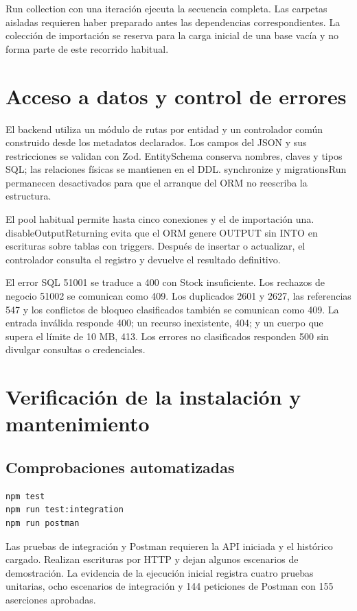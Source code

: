 \documentclass[10pt,letterpaper]{article}
\begin{document}
Run collection con una iteración ejecuta la secuencia completa. Las carpetas aisladas requieren haber preparado antes las dependencias correspondientes. La colección de importación se reserva para la carga inicial de una base vacía y no forma parte de este recorrido habitual.

\section{Acceso a datos y control de errores}
El backend utiliza un módulo de rutas por entidad y un controlador común construido desde los metadatos declarados. Los campos del JSON y sus restricciones se validan con Zod. EntitySchema conserva nombres, claves y tipos SQL; las relaciones físicas se mantienen en el DDL. synchronize y migrationsRun permanecen desactivados para que el arranque del ORM no reescriba la estructura.

El pool habitual permite hasta cinco conexiones y el de importación una. disableOutputReturning evita que el ORM genere OUTPUT sin INTO en escrituras sobre tablas con triggers. Después de insertar o actualizar, el controlador consulta el registro y devuelve el resultado definitivo.

El error SQL 51001 se traduce a 400 con Stock insuficiente. Los rechazos de negocio 51002 se comunican como 409. Los duplicados 2601 y 2627, las referencias 547 y los conflictos de bloqueo clasificados también se comunican como 409. La entrada inválida responde 400; un recurso inexistente, 404; y un cuerpo que supera el límite de 10 MB, 413. Los errores no clasificados responden 500 sin divulgar consultas o credenciales.

\section{Verificación de la instalación y mantenimiento}
\subsection{Comprobaciones automatizadas}
\begin{lstlisting}
npm test
npm run test:integration
npm run postman
\end{lstlisting}
Las pruebas de integración y Postman requieren la API iniciada y el histórico cargado. Realizan escrituras por HTTP y dejan algunos escenarios de demostración. La evidencia de la ejecución inicial registra cuatro pruebas unitarias, ocho escenarios de integración y 144 peticiones de Postman con 155 aserciones aprobadas.
\end{document}
